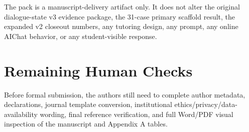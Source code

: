 \documentclass[11pt]{article}
\begin{document}
The pack is a manuscript-delivery artifact only. It does not alter the original dialogue-state v3 evidence package, the 31-case primary scaffold result, the expanded v2 closeout numbers, any tutoring design, any prompt, any online AIChat behavior, or any student-visible response.

\section*{Remaining Human Checks}

Before formal submission, the authors still need to complete author metadata, declarations, journal template conversion, institutional ethics/privacy/data-availability wording, final reference verification, and full Word/PDF visual inspection of the manuscript and Appendix A tables.
\end{document}
